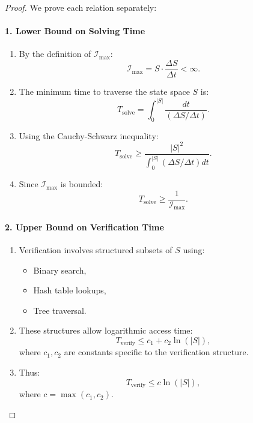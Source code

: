 \documentclass[12pt]{article}
\begin{document}
\begin{proof}
We prove each relation separately:

\paragraph{1. Lower Bound on Solving Time}
\begin{enumerate}
    \item By the definition of \(\mathcal{I}_{\text{max}}\):
    \[
    \mathcal{I}_{\text{max}} = S \cdot \frac{\Delta S}{\Delta t} < \infty.
    \]
    
    \item The minimum time to traverse the state space \(S\) is:
    \[
    T_{\text{solve}} = \int_0^{|S|} \frac{dt}{(\Delta S/\Delta t)}.
    \]
    
    \item Using the Cauchy-Schwarz inequality:
    \[
    T_{\text{solve}} \geq \frac{|S|^2}{\int_0^{|S|} (\Delta S/\Delta t) dt}.
    \]
    
    \item Since \(\mathcal{I}_{\text{max}}\) is bounded:
    \[
    T_{\text{solve}} \geq \frac{1}{\mathcal{I}_{\text{max}}}.
    \]
\end{enumerate}

\paragraph{2. Upper Bound on Verification Time}
\begin{enumerate}
    \item Verification involves structured subsets of \(S\) using:
    \begin{itemize}
        \item Binary search,
        \item Hash table lookups,
        \item Tree traversal.
    \end{itemize}
    
    \item These structures allow logarithmic access time:
    \[
    T_{\text{verify}} \leq c_1 + c_2\ln(|S|),
    \]
    where \(c_1, c_2\) are constants specific to the verification structure.
    
    \item Thus:
    \[
    T_{\text{verify}} \leq c\ln(|S|),
    \]
    where \(c = \max(c_1, c_2)\).
\end{enumerate}
\end{proof}
\end{document}
